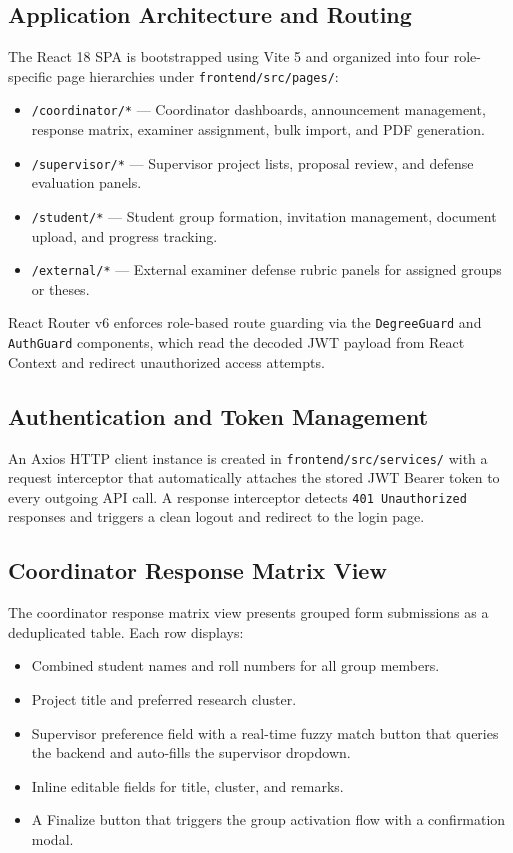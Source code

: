 \subsection{Application Architecture and Routing}
The React 18 SPA is bootstrapped using Vite 5 and organized into four role-specific page hierarchies under \texttt{frontend/src/pages/}:
\begin{itemize}
    \item \texttt{/coordinator/*} --- Coordinator dashboards, announcement management, response matrix, examiner assignment, bulk import, and PDF generation.
    \item \texttt{/supervisor/*} --- Supervisor project lists, proposal review, and defense evaluation panels.
    \item \texttt{/student/*} --- Student group formation, invitation management, document upload, and progress tracking.
    \item \texttt{/external/*} --- External examiner defense rubric panels for assigned groups or theses.
\end{itemize}
React Router v6 enforces role-based route guarding via the \texttt{DegreeGuard} and \texttt{AuthGuard} components, which read the decoded JWT payload from React Context and redirect unauthorized access attempts.

\subsection{Authentication and Token Management}
An Axios HTTP client instance is created in \texttt{frontend/src/services/} with a request interceptor that automatically attaches the stored JWT Bearer token to every outgoing API call. A response interceptor detects \texttt{401 Unauthorized} responses and triggers a clean logout and redirect to the login page.

\subsection{Coordinator Response Matrix View}
The coordinator response matrix view presents grouped form submissions as a deduplicated table. Each row displays:
\begin{itemize}
    \item Combined student names and roll numbers for all group members.
    \item Project title and preferred research cluster.
    \item Supervisor preference field with a real-time fuzzy match button that queries the backend and auto-fills the supervisor dropdown.
    \item Inline editable fields for title, cluster, and remarks.
    \item A Finalize button that triggers the group activation flow with a confirmation modal.
\end{itemize}

